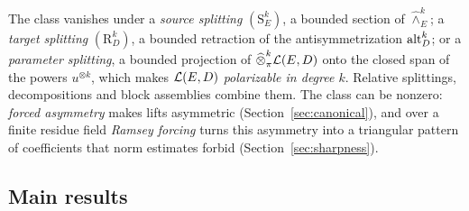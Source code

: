 The class vanishes under a \emph{source splitting} $(\mathrm S^k_E)$, a bounded section of $\widehat\wedge^k_E$; a
\emph{target splitting} $(\mathrm R^k_D)$, a bounded retraction of the antisymmetrization $\operatorname{alt}^k_D$; or a
\emph{parameter splitting}, a bounded projection of $\widehat\otimes^k_\pi\mathcal L(E,D)$ onto the closed span of the powers
$u^{\otimes k}$, which makes $\mathcal L(E,D)$ \emph{polarizable in degree $k$}. Relative splittings, decompositions and
block assemblies combine them. The class can be nonzero: \emph{forced asymmetry} makes lifts asymmetric
(Section~\ref{sec:canonical}), and over a finite residue field \emph{Ramsey forcing} turns this asymmetry into a
triangular pattern of coefficients that norm estimates forbid (Section~\ref{sec:sharpness}).

\subsection*{Main results}


